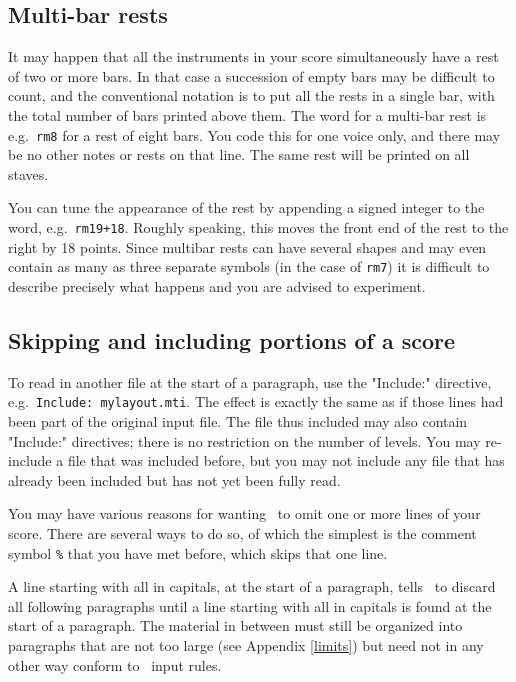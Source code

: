 \documentclass[11pt]{article}
\begin{document}
\subsection{Multi-bar rests}   \label{rests}

It may happen that all the instruments in your score
simultaneously have a rest of two or more bars.  In that case a succession
of empty bars may be difficult to count, and the conventional notation
is to put all the rests in a single bar, with the total number of
bars printed above them.  The word for a \mark multi-bar rest is e.g.\
\texttt{rm8} for a rest of eight bars.  You code this for one voice only,
and there may be no other notes or rests on that line.  The same rest
will be printed on all staves.


You can tune the appearance of the rest by appending a signed integer
to the word, e.g.\ \texttt{rm19+18}.   \NEW{0.41}Roughly speaking,
this moves the front end of the rest to the right by 18 points. Since
multibar rests can have several shapes and may even contain as many as
three separate symbols (in the case of \texttt{rm7}) it is difficult to
describe precisely what happens and you are advised to experiment.

\subsection{Skipping and including portions of a score}   \label{multiscore} 

To read in another file at the start of a paragraph, 
use the \ttxem"Include:" directive, e.g.\ \verb"Include: mylayout.mti".
The effect is exactly the same as if those lines had been part of the original
input file.  The file thus included may also contain "Include:"
directives; there is no restriction on the number of levels.  You may
re-include a file that was included before, but you may not include any
file that has already been included but has not yet been fully read. 

You may have various reasons for wanting \MTx\ to omit one or more lines of 
your score.  There are several ways to do so, of which the simplest is the 
comment symbol \verb'%' that you have met before, which skips that one line.  

A line starting with  all in capitals, at the start of a
paragraph, tells \MTx\ to discard all following paragraphs until a line 
starting with \ttxem{RESUME} all in capitals is found at the start of a
paragraph.  The material in between must still be organized into paragraphs
that are not too large (see Appendix \ref{limits}) but need not in any other
way conform to \MTx\ input rules.
\end{document}
